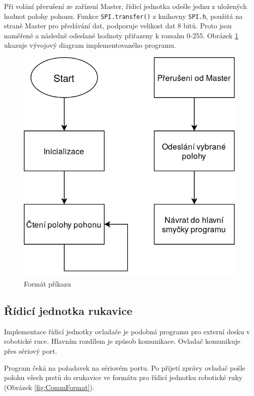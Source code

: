 \documentclass[thesis=B,czech]{FITthesis}[2012/06/26]
\begin{document}
Při volání přerušení ze zařízení Master, řídicí jednotka odešle jednu z uložených hodnot polohy pohonu. Funkce \texttt{SPI.transfer()} z knihovny \texttt{SPI.h}, použitá na straně Master pro předávání dat, podporuje velikost dat 8 bitů. Proto jsou naměřené a následně odeslané hodnoty přiřazeny k rozsahu 0-255. Obrázek \ref{fig:ExtDeskProgDiag} ukazuje vývojový diagram implementovaného programu.


 \begin{figure}[H]
\centering
\includegraphics[scale=0.35]{./image/ExtDeskProgDiag.png}
\caption{Formát příkazu}
\label{fig:ExtDeskProgDiag}
\end{figure} 

\subsection{Řídicí jednotka rukavice}

Implementace řídicí jednotky ovladače je podobná programu pro externí desku v robotické ruce. Hlavním rozdílem je způsob komunikace. Ovladač komunikuje přes sériový port. 

Program čeká na požadavek na sériovém portu. Po přijetí zprávy ovladač pošle polohu všech prstů do srukavice ve formátu pro řídicí jednotku robotické ruky (Obrázek \ref{fig:CommFormat}). 
\end{document}

